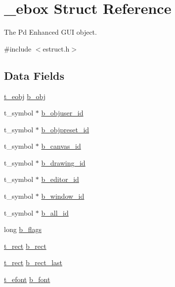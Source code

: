 \hypertarget{struct__ebox}{\section{\-\_\-ebox Struct Reference}
\label{struct__ebox}
}


The Pd Enhanced G\-U\-I object.  




{\ttfamily \#include $<$estruct.\-h$>$}

\subsection*{Data Fields}
\begin{DoxyCompactItemize}
\item 
\hyperlink{struct__eobj}{t\-\_\-eobj} \hyperlink{struct__ebox_a384a670299e98768527fbe457de9a38a}{b\-\_\-obj}
\item 
t\-\_\-symbol $\ast$ \hyperlink{struct__ebox_ae324f65e10196cc7e166652e8d7d394d}{b\-\_\-objuser\-\_\-id}
\item 
t\-\_\-symbol $\ast$ \hyperlink{struct__ebox_adc377263d208d1051f4a0997868b1155}{b\-\_\-objpreset\-\_\-id}
\item 
t\-\_\-symbol $\ast$ \hyperlink{struct__ebox_ac0251c6969a1032f8f50d076e909fb3e}{b\-\_\-canvas\-\_\-id}
\item 
t\-\_\-symbol $\ast$ \hyperlink{struct__ebox_a153f9c9929d722ecb29217f3fb0914c9}{b\-\_\-drawing\-\_\-id}
\item 
t\-\_\-symbol $\ast$ \hyperlink{struct__ebox_adf8c80c6ea45ad810c754984d98830ff}{b\-\_\-editor\-\_\-id}
\item 
t\-\_\-symbol $\ast$ \hyperlink{struct__ebox_a7033df943e798c68e3a6117785c2d79e}{b\-\_\-window\-\_\-id}
\item 
t\-\_\-symbol $\ast$ \hyperlink{struct__ebox_a0f63dcf604135dd4fbfbf43eaed53c1a}{b\-\_\-all\-\_\-id}
\item 
long \hyperlink{struct__ebox_abdae234dbd983dfbfb0592858c4ff026}{b\-\_\-flags}
\item 
\hyperlink{struct__rect}{t\-\_\-rect} \hyperlink{struct__ebox_abc70ff46c135ee9f377a038bbc05a33e}{b\-\_\-rect}
\item 
\hyperlink{struct__rect}{t\-\_\-rect} \hyperlink{struct__ebox_a2a0a15d3bc005cd4f815088b230b5ebd}{b\-\_\-rect\-\_\-last}
\item 
\hyperlink{struct__efont}{t\-\_\-efont} \hyperlink{struct__ebox_a4071412a20456f5fcafe2a91cdef11c3}{b\-\_\-font}
\item 

\end{DoxyCompactItemize}
